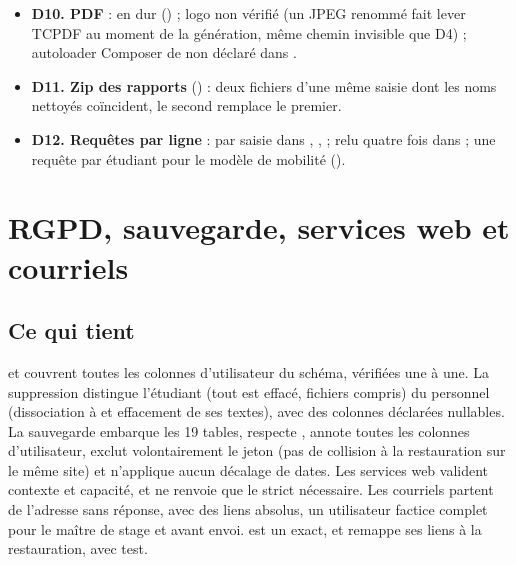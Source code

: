 \documentclass[11pt,a4paper]{article}
\newcommand{\grav}[1]{\textbf{\textcolor{#1}{\textbullet}}}
\newcommand{\mineure}{\grav{gray}}
\begin{document}
\begin{itemize}
    check-lists, réponses, fichiers, mobilité d'études ; année \og non précisée\fg{} absente des
    options (144, un avertissement par ligne) ; oui/non reconnus en français et anglais seulement
    (55) ; aucune détection de doublon à l'intérieur du classeur (52) ; auto-évaluation convertie
    en texte () puis réaffichée en .
  \item[\mineure] \textbf{D10. PDF} :  en dur () ;
    logo  non vérifié (un JPEG renommé fait lever TCPDF au moment de la génération, même
    chemin invisible que D4) ; autoloader Composer de  non déclaré dans
    .
  \item[\mineure] \textbf{D11. Zip des rapports} () : deux fichiers d'une
    même saisie dont les noms nettoyés coïncident, le second remplace le premier.
  \item[\mineure] \textbf{D12. Requêtes par ligne} :  par
    saisie dans , ,  ;
     relu quatre fois dans  ; une requête par étudiant
    pour le modèle de mobilité ().
\end{itemize}

\section{RGPD, sauvegarde, services web et courriels}

\subsection{Ce qui tient}

 et  couvrent toutes les colonnes
d'utilisateur du schéma, vérifiées une à une. La suppression distingue l'étudiant (tout est
effacé, fichiers compris) du personnel (dissociation à  et effacement de ses textes),
avec des colonnes déclarées nullables. La sauvegarde embarque les 19 tables, respecte
, annote toutes les colonnes d'utilisateur, exclut volontairement le jeton (pas de
collision à la restauration sur le même site) et n'applique aucun décalage de dates. Les
services web valident contexte et capacité, et  ne renvoie que le strict
nécessaire. Les courriels partent de l'adresse sans réponse, avec des liens absolus, un
utilisateur factice complet pour le maître de stage et  avant envoi.
 est un  exact, et remappe ses liens à la
restauration, avec test.
\end{document}
